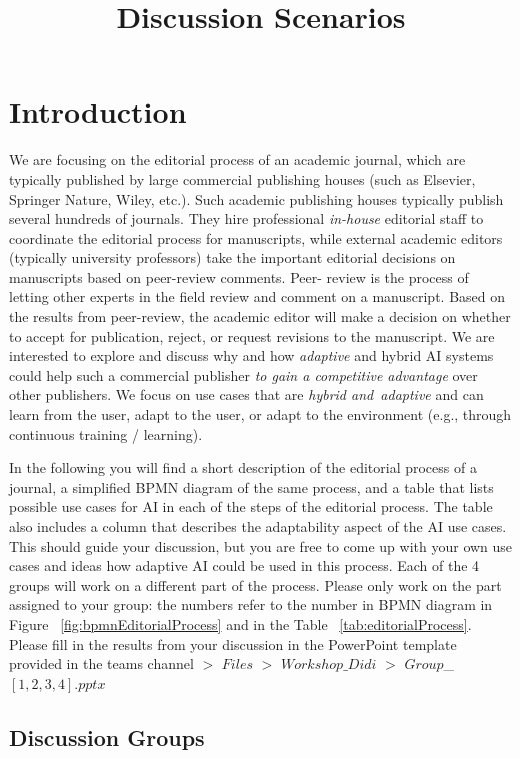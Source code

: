 \documentclass{article}
\title{Discussion Scenarios}
\begin{document}
\maketitle

\section{Introduction}

We are focusing on the editorial process of an academic journal, which are typically published by large commercial publishing houses
(such as Elsevier, Springer Nature, Wiley, etc.). Such academic publishing houses typically publish several hundreds of journals.
They hire professional \textit{in-house} editorial staff to coordinate the editorial process for manuscripts, while external academic
editors (typically university professors) take the important editorial decisions on manuscripts based on peer-review comments. Peer-
review is the process of letting other experts in the field review and comment on a manuscript. Based on the results from peer-review,
the academic editor will make a decision on whether to accept for publication, reject, or request revisions to the manuscript. 
We are interested to explore and discuss why and how \textit{adaptive} and hybrid AI systems could help such a commercial publisher
\textit{to gain a competitive advantage} over other publishers. We focus on use cases that are \textit{hybrid and adaptive} and can
learn from the user, adapt to the user, or adapt to the environment (e.g., through continuous training / learning).

In the following you will find a short description of the editorial process of a journal, a simplified BPMN diagram of the same 
process, and a table that lists possible use cases for AI in each of the steps of the editorial process. The table also includes
a column that describes the adaptability aspect of the AI use cases. This should guide your discussion, but you are free to
come up with your own use cases and ideas how adaptive AI could be used in this process. Each of the 4 groups will work on a
different part of the process. Please only work on the part assigned to your group: the numbers refer to the number in BPMN diagram
in Figure ~\ref{fig:bpmnEditorialProcess} and in the Table ~\ref{tab:editorialProcess}. Please fill in the results from your
discussion in the PowerPoint template provided in the teams channel $>$ $Files$ $>$ $Workshop\_Didi$ $>$ $Group$\_$[1,2,3,4].pptx$

\subsection{Discussion Groups}
\end{document}
